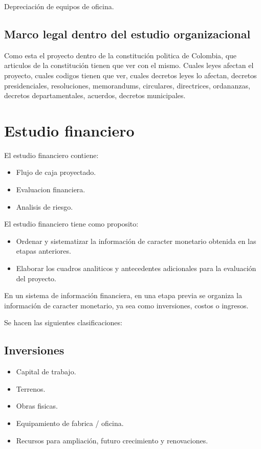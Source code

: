 \documentclass[a4paper, 11pt, oneside]{article}
\begin{document}
Depreciación de equipos de oficina.

\subsection{Marco legal dentro del estudio organizacional}

Como esta el proyecto dentro de la constitución politica de Colombia, que articulos de la constitución tienen que ver con el mismo. Cuales leyes
afectan el proyecto, cuales codigos tienen que ver, cuales decretos leyes lo afectan, decretos presidenciales, resoluciones, memorandums, circulares,
directrices, ordananzas, decretos departamentales, acuerdos, decretos municipales.

\section{Estudio financiero}

El estudio financiero contiene:

\begin{itemize}
	\item Flujo de caja proyectado.
	\item Evaluacion financiera.
	\item Analisis de riesgo.
\end{itemize}

El estudio financiero tiene como proposito:

\begin{itemize}
	\item Ordenar y sistematizar la información de caracter monetario obtenida en las etapas anteriores.
	\item Elaborar los cuadros analiticos y antecedentes adicionales para la evaluación del proyecto.
\end{itemize}

En un sistema de información financiera, en una etapa previa se organiza la información de caracter monetario, ya sea como inversiones, costos o 
ingresos.

Se hacen las siguientes clasificaciones:

\subsection{Inversiones}

\begin{itemize}
	\item Capital de trabajo.
	\item Terrenos.
	\item Obras fisicas.
	\item Equipamiento de fabrica / oficina.
	\item Recursos para ampliación, futuro crecimiento y renovaciones.
\end{itemize}
\end{document}

